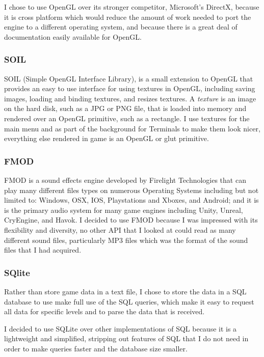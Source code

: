 \documentclass{article}
\begin{document}
I chose to use OpenGL over its stronger competitor, Microsoft's DirectX, because it is cross platform which would reduce the amount of work needed to port the engine to a different operating system, and because there is a great deal of documentation easily available for OpenGL.

\subsubsection{SOIL} \label{subsubsec:SOIL}

SOIL (Simple OpenGL Interface Library), is a small extension to OpenGL that provides an easy to use interface for using textures in OpenGL, including saving images, loading and binding textures, and resizes textures. A \emph{texture} is an image on the hard disk, such as a JPG or PNG file, that is loaded into memory and rendered over an OpenGL primitive, such as a rectangle. I use textures for the main menu and as part of the background for Terminals to make them look nicer, everything else rendered in game is an OpenGL or glut primitive.

\subsubsection{FMOD} \label{subsubsec:FMOD}

FMOD is a sound effects engine developed by Firelight Technologies that can play many different files types on numerous Operating Systems including but not limited to: Windows, OSX, IOS, Playstations and Xboxes, and Android; and it is is the primary audio system for many game engines including Unity, Unreal, CryEngine, and Havok. I decided to use FMOD because I was impressed with its flexibility and diversity, no other API that I looked at could read as many different sound files, particularly MP3 files which was the format of the sound files that I had acquired.

\subsubsection{SQlite} \label{subsubsec:SQLite}

Rather than store game data in a text file, I chose to store the data in a SQL database to use make full use of the SQL queries, which make it easy to request all data for specific levels and to parse the data that is received. 

I decided to use SQLite over other implementations of SQL because it is a lightweight and simplified, stripping out features of SQL that I do not need in order to make queries faster and the database size smaller.
\end{document}
